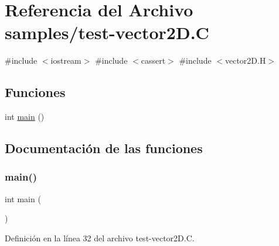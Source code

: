 \hypertarget{test-vector2_d_8_c}{}\section{Referencia del Archivo samples/test-\/vector2D.C}
\label{test-vector2_d_8_c}
{\ttfamily \#include $<$iostream$>$}\newline
{\ttfamily \#include $<$cassert$>$}\newline
{\ttfamily \#include $<$vector2\+D.\+H$>$}\newline
\subsection*{Funciones}
\begin{DoxyCompactItemize}
\item 
int \hyperlink{test-vector2_d_8_c_ae66f6b31b5ad750f1fe042a706a4e3d4}{main} ()
\end{DoxyCompactItemize}


\subsection{Documentación de las funciones}
\mbox{\label{test-vector2_d_8_c_ae66f6b31b5ad750f1fe042a706a4e3d4}} 
\subsubsection{\texorpdfstring{main()}{main()}}
{\footnotesize\ttfamily int main (\begin{DoxyParamCaption}{ }\end{DoxyParamCaption})}



Definición en la línea 32 del archivo test-\/vector2\+D.\+C.

